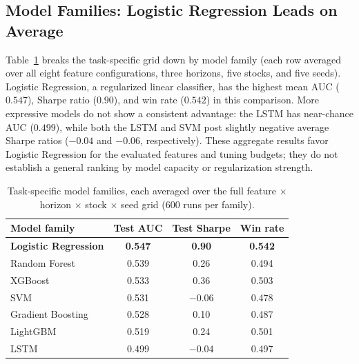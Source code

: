 \documentclass[conference]{IEEEtran}
\begin{document}
\subsection{Model Families: Logistic Regression Leads on Average}
Table~\ref{tab:models} breaks the task-specific grid down by model family
(each row averaged over all eight feature configurations, three horizons, five
stocks, and five seeds).
Logistic Regression, a regularized linear classifier, has the highest mean
AUC ($0.547$), Sharpe ratio ($0.90$), and win rate ($0.542$) in this comparison.
More expressive models do not show a consistent advantage: the LSTM has
near-chance AUC ($0.499$), while both the LSTM and SVM post slightly negative
average Sharpe ratios ($-0.04$ and $-0.06$, respectively). These aggregate
results favor Logistic Regression for the evaluated features and tuning
budgets; they do not establish a general ranking by model capacity or
regularization strength.

\begin{table}[t]
\caption{Task-specific model families, each averaged over the full feature
$\times$ horizon $\times$ stock $\times$ seed grid ($600$ runs per family).}
\label{tab:models}
\centering
\small
\begin{tabular}{lccc}
\toprule
Model family & Test AUC & Test Sharpe & Win rate \\
\midrule
\textbf{Logistic Regression} & \textbf{0.547} & \textbf{0.90} & \textbf{0.542} \\
Random Forest                & 0.539 & 0.26 & 0.494 \\
XGBoost                      & 0.533 & 0.36 & 0.503 \\
SVM                          & 0.531 & $-0.06$ & 0.478 \\
Gradient Boosting            & 0.528 & 0.10 & 0.487 \\
LightGBM                     & 0.519 & 0.24 & 0.501 \\
LSTM                         & 0.499 & $-0.04$ & 0.497 \\
\bottomrule
\end{tabular}
\end{table}
\end{document}
